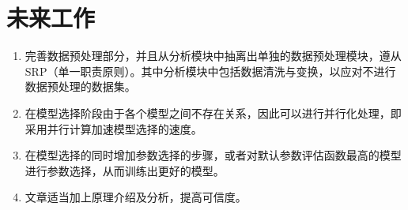 \section{未来工作}\label{S:future-work}
\begin{enumerate}
    \item 完善数据预处理部分，并且从分析模块中抽离出单独的数据预处理模块，遵从SRP（单一职责原则）。其中分析模块中包括数据清洗与变换，以应对不进行数据预处理的数据集。
    \item 在模型选择阶段由于各个模型之间不存在关系，因此可以进行并行化处理，即采用并行计算加速模型选择的速度。
    \item 在模型选择的同时增加参数选择的步骤，或者对默认参数评估函数最高的模型进行参数选择，从而训练出更好的模型。
    \item 文章适当加上原理介绍及分析，提高可信度。
\end{enumerate}
